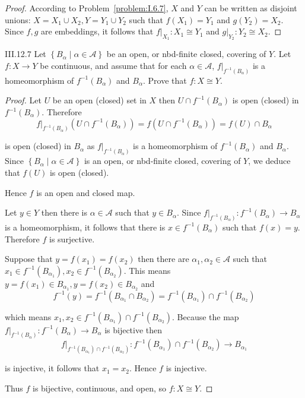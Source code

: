 \begin{proof}
	According to Problem~\ref{problem:I.6.7}, \( X \) and \( Y \) can be written as disjoint unions: \( X = X_{1} \cup X_{2}, Y = Y_{1} \cup Y_{2} \) such that \( f(X_{1}) = Y_{1} \) and \( g(Y_{2}) = X_{2} \). Since \( f, g \) are embeddings, it follows that \( f\vert_{X_{1}}: X_{1} \cong Y_{1} \) and \( g\vert_{Y_{2}}: Y_{2} \cong X_{2} \).
\end{proof}

\begin{problem}{III.12.7}
Let \( \left\{ B_{\alpha} \mid \alpha \in \mathscr{A} \right\} \) be an open, or nbd-finite closed, covering of \( Y \). Let \( f: X \to Y \) be continuous, and assume that for each \( \alpha \in \mathscr{A} \), \( f\vert_{f^{-1}(B_{\alpha})} \) is a homeomorphism of \( f^{-1}(B_{\alpha}) \) and \( B_{\alpha} \). Prove that \( f: X \cong Y \).
\end{problem}

\begin{proof}
	Let \( U \) be an open (closed) set in \( X \) then \( U \cap f^{-1}(B_{\alpha}) \) is open (closed) in \( f^{-1}(B_{\alpha}) \). Therefore
	\[
		f\vert_{f^{-1}(B_{\alpha})}(U \cap f^{-1}(B_{\alpha})) = f(U \cap f^{-1}(B_{\alpha})) = f(U) \cap B_{\alpha}
	\]

	is open (closed) in \( B_{\alpha} \) as \( f\vert_{f^{-1}(B_{\alpha})} \) is a homeomorphism of \( f^{-1}(B_{\alpha}) \) and \( B_{\alpha} \). Since \( \left\{ B_{\alpha} \mid \alpha \in \mathscr{A} \right\} \) is an open, or nbd-finite closed, covering of \( Y \), we deduce that \( f(U) \) is open (closed).

	Hence \( f \) is an open and closed map.

	Let \( y \in Y \) then there is \( \alpha\in\mathscr{A} \) such that \( y \in B_{\alpha} \). Since \( f\vert_{f^{-1}(B_{\alpha})}: f^{-1}(B_{\alpha}) \to B_{\alpha} \) is a homeomorphism, it follows that there is \( x \in f^{-1}(B_{\alpha}) \) such that \( f(x) = y \). Therefore \( f \) is surjective.

	Suppose that \( y = f(x_{1}) = f(x_{2}) \) then there are \( \alpha_{1}, \alpha_{2} \in \mathscr{A} \) such that \( x_{1} \in f^{-1}(B_{\alpha_{1}}), x_{2} \in f^{-1}(B_{\alpha_{2}}) \). This means \( y = f(x_{1}) \in B_{\alpha_{1}}, y = f(x_{2}) \in B_{\alpha_{2}} \) and
	\[
		f^{-1}(y) = f^{-1}(B_{\alpha_{1}} \cap B_{\alpha_{2}}) = f^{-1}(B_{\alpha_{1}}) \cap f^{-1}(B_{\alpha_{2}})
	\]

	which means \( x_{1}, x_{2} \in f^{-1}(B_{\alpha_{1}}) \cap f^{-1}(B_{\alpha_{2}}) \). Because the map \( f\vert_{f^{-1}(B_{\alpha})}: f^{-1}(B_{\alpha}) \to B_{\alpha} \) is bijective then
	\[
		f\vert_{f^{-1}(B_{\alpha_{1}}) \cap f^{-1}(B_{\alpha_{2}})}: f^{-1}(B_{\alpha_{1}}) \cap f^{-1}(B_{\alpha_{2}}) \to B_{\alpha_{1}}
	\]

	is injective, it follows that \( x_{1} = x_{2} \). Hence \( f \) is injective.

	Thus \( f \) is bijective, continuous, and open, so \( f: X \cong Y \).
\end{proof}

